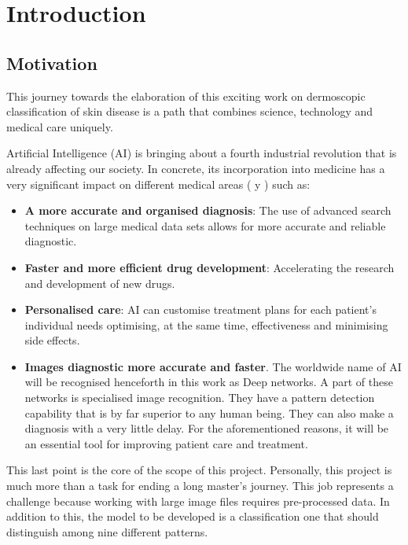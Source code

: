 \chapter{Introduction}
\label{chapter:introduction}


\section{Motivation}

This journey towards the elaboration of this exciting work on dermoscopic classification of skin disease is a path that combines science, technology and medical care uniquely. 

Artificial Intelligence (AI) is bringing about a fourth industrial revolution that is already affecting our society. In concrete, its incorporation into medicine has a very significant impact on different medical areas (\cite{luciaclemares_que_2023} y \cite{apd_aplicaciones_IA_Medicina}) such as:

\begin{itemize}
    \item \textbf{A more accurate and organised diagnosis}: The use of advanced search techniques on large medical data sets allows for more accurate and reliable diagnostic. 
    \item \textbf{Faster and more efficient drug development}: Accelerating the research and development of new drugs.
    \item \textbf{Personalised care}: AI can customise treatment plans for each patient's individual needs optimising, at the same time, effectiveness and minimising side effects.
    \item \textbf{Images diagnostic more accurate and faster}. The worldwide name of AI will be recognised henceforth in this work as Deep networks. A part of these networks is specialised image recognition. They have a pattern detection capability that is by far superior to any human being. They can also make a diagnosis with a very little delay. For the aforementioned reasons, it will be an essential tool for improving patient care and treatment. 
\end{itemize}

This last point is the core of the scope of this project. Personally, this project is much more than a task for ending a long master's journey. This job represents a challenge because working with large image files requires pre-processed data. In addition to this, the model to be developed is a classification one that should distinguish among nine different patterns.

